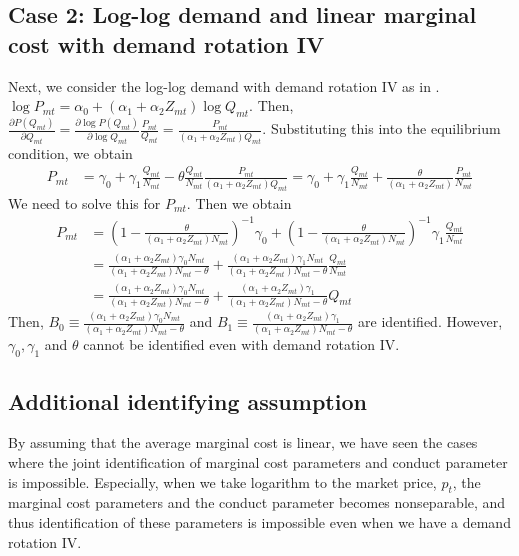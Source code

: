 \documentclass[11pt]{article}
\begin{document}
\subsection{Case 2: Log-log demand and linear marginal cost with demand rotation IV}
Next, we consider the log-log demand with demand rotation IV as in \cite{bresnahan1982oligopoly}.
$\log P_{mt}=\alpha_0+(\alpha_1+\alpha_2 Z_{mt}) \log Q_{mt}$. Then, $\frac{\partial P\left(Q_{m t}\right)}{\partial Q_{mt}}=\frac{\partial \log P\left(Q_{m t}\right)}{\partial \log Q_{mt}}\frac{P_{mt}}{Q_{mt}}=\frac{P_{mt}}{(\alpha_1+\alpha_2 Z_{mt}) Q_{mt}}$. Substituting this into the equilibrium condition, we obtain
    \begin{align}
        P_{m t}&=\gamma_0+\gamma_1 \frac{Q_{mt}}{N_{mt}}-\theta \frac{Q_{mt}}{N_{mt}}\frac{P_{mt}}{(\alpha_1+\alpha_2 Z_{mt}) Q_{mt}}=\gamma_0+\gamma_1 \frac{Q_{mt}}{N_{mt}}+ \frac{\theta}{(\alpha_1+\alpha_2 Z_{mt})}\frac{P_{mt}}{N_{mt}}
    \end{align}
    We need to solve this for $P_{mt}$. Then we obtain
    \begin{align*}
        P_{m t}&=\left(1-\frac{\theta}{(\alpha_1+\alpha_2 Z_{mt}) N_{mt}}\right)^{-1}\gamma_0+\left(1-\frac{\theta}{(\alpha_1+\alpha_2 Z_{mt}) N_{mt}}\right)^{-1}\gamma_1 \frac{Q_{mt}}{N_{mt}}\\
        & =\frac{(\alpha_1+\alpha_2 Z_{mt}) \gamma_0 N_{mt}}{(\alpha_1+\alpha_2 Z_{mt}) N_{mt}-\theta}+\frac{(\alpha_1+\alpha_2 Z_{mt}) \gamma_1 N_{mt}}{(\alpha_1+\alpha_2 Z_{mt}) N_{mt}-\theta} \frac{Q_{mt}}{N_{mt}}\\
        &=\frac{(\alpha_1+\alpha_2 Z_{mt}) \gamma_0 N_{mt}}{(\alpha_1+\alpha_2 Z_{mt}) N_{mt}-\theta}+\frac{(\alpha_1+\alpha_2 Z_{mt}) \gamma_1}{(\alpha_1+\alpha_2 Z_{mt}) N_{mt}-\theta} Q_{mt}
    \end{align*}
    Then, $B_0 \equiv \frac{(\alpha_1+\alpha_2 Z_{mt}) \gamma_0 N_{mt}}{(\alpha_1+\alpha_2 Z_{mt}) N_{mt}-\theta}$ and $B_1\equiv\frac{(\alpha_1+\alpha_2 Z_{mt}) \gamma_1}{(\alpha_1+\alpha_2 Z_{mt}) N_{mt}-\theta}$ are identified. However, $\gamma_0,\gamma_1$ and $\theta$ cannot be identified even with demand rotation IV.



\subsection{Additional identifying assumption}

By assuming that the average marginal cost is linear, we have seen the cases where the joint identification of marginal cost parameters and conduct parameter is impossible.
Especially, when we take logarithm to the market price, $p_t$, the marginal cost parameters and the conduct parameter becomes nonseparable, and thus identification of these parameters is impossible even when we have a demand rotation IV. 
\end{document}
